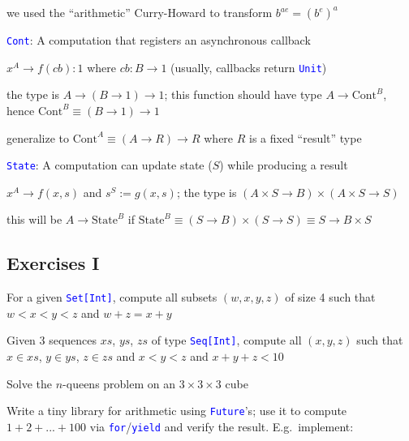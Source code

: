 we used the ``arithmetic'' Curry-Howard to transform $b^{ae}=(b^{e})^{a}$

\texttt{\textcolor{blue}{\footnotesize{}Cont}}: A computation that
registers an asynchronous callback

$x^{A}\rightarrow f(cb):1$ where $cb:B\rightarrow1$ (usually, callbacks
return \texttt{\textcolor{blue}{\footnotesize{}Unit}})

the type is{\footnotesize{} $A\rightarrow\left(B\rightarrow1\right)\rightarrow1$};
this function should have type {\footnotesize{}$A\rightarrow\text{Cont}^{B}$},
hence{\footnotesize{} $\text{Cont}^{B}\equiv\left(B\rightarrow1\right)\rightarrow1$}{\footnotesize\par}

generalize to {\footnotesize{}$\text{Cont}^{A}\equiv\left(A\rightarrow R\right)\rightarrow R$
}where $R$ is a fixed ``result'' type

\texttt{\textcolor{blue}{\footnotesize{}State}}: A computation can
update state ($S$) while producing a result

$x^{A}\rightarrow f(x,s)$ and $s^{S}:=g(x,s)$; the type is{\footnotesize{}
$\left(A\times S\rightarrow B\right)\times\left(A\times S\rightarrow S\right)$}{\footnotesize\par}

this will be $A\rightarrow\text{State}^{B}$ if {\footnotesize{}$\text{State}^{B}\equiv\left(S\rightarrow B\right)\times\left(S\rightarrow S\right)\equiv S\rightarrow B\times S$ }{\footnotesize\par}


\subsection{Exercises I}

For a given \texttt{\textcolor{blue}{\footnotesize{}Set{[}Int{]}}},
compute all subsets $\left(w,x,y,z\right)$ of size 4 such that $w<x<y<z$
and $w+z=x+y$

Given 3 sequences $xs$, $ys$, $zs$ of type \texttt{\textcolor{blue}{\footnotesize{}Seq{[}Int{]}}},
compute all $\left(x,y,z\right)$ such that $x\in xs$, $y\in ys$,
$z\in zs$ and $x<y<z$ and $x+y+z<10$

Solve the $n$-queens problem on an $3\times3\times3$ cube

Write a tiny library for arithmetic using \texttt{\textcolor{blue}{\footnotesize{}Future}}'s;
use it to compute $1+2+...+100$ via \texttt{\textcolor{blue}{\footnotesize{}for}}/\texttt{\textcolor{blue}{\footnotesize{}yield}}
and verify the result. E.g.\ implement: 

